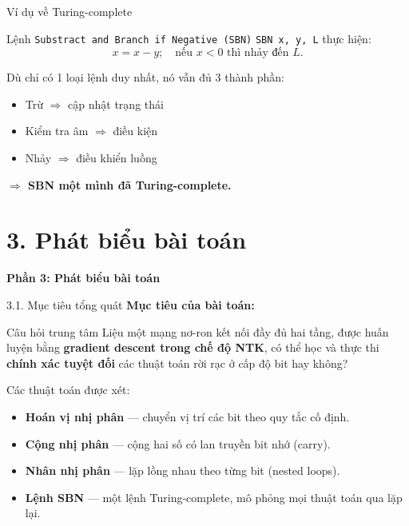 \documentclass[10pt, aspectratio=169]{beamer}
\begin{document}
\begin{frame}{Ví dụ về Turing-complete}
    \begin{block}{Lệnh \texttt{Substract and Branch if Negative (SBN)}}
        \texttt{SBN x, y, L} thực hiện:
        \[
        x = x - y; \quad \text{nếu } x < 0 \text{ thì nhảy đến } L.
        \]

        Dù chỉ có 1 loại lệnh duy nhất, nó vẫn đủ 3 thành phần:
        \begin{itemize}
            \item Trừ $\Rightarrow$ cập nhật trạng thái
            \item Kiểm tra âm $\Rightarrow$ điều kiện
            \item Nhảy $\Rightarrow$ điều khiển luồng
        \end{itemize}

        \textbf{$\Rightarrow$ SBN một mình đã Turing-complete.}
    \end{block}
\end{frame}

\section{3. Phát biểu bài toán}

\begin{frame}
    \centering
    \Huge \textbf{Phần 3: Phát biểu bài toán}
\end{frame}

\begin{frame}{3.1. Mục tiêu tổng quát}
    \textbf{Mục tiêu của bài toán:}

    \begin{block}{Câu hỏi trung tâm}
        Liệu một mạng nơ-ron kết nối đầy đủ hai tầng, được huấn luyện bằng 
        \textbf{gradient descent trong chế độ NTK}, có thể học và thực thi 
        \textbf{chính xác tuyệt đối} các thuật toán rời rạc ở cấp độ bit hay không?
    \end{block}


    Các thuật toán được xét:
    \begin{itemize}
    \item \textbf{Hoán vị nhị phân} — chuyển vị trí các bit theo quy tắc cố định.
    \item \textbf{Cộng nhị phân} — cộng hai số có lan truyền bit nhớ (carry).
    \item \textbf{Nhân nhị phân} — lặp lồng nhau theo từng bit (nested loops).
    \item \textbf{Lệnh SBN} — một lệnh Turing-complete, mô phỏng mọi thuật toán qua lặp lại.
\end{itemize}


\end{frame}
\end{document}
